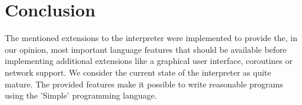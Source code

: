 \documentclass{article}
\begin{document}
\section{Conclusion}
The mentioned extensions to the interpreter were implemented to provide the, in our opinion, most important language features that should be available before implementing additional extensions like a graphical user interface, coroutines or network support. We consider the current state of the interpreter as quite mature. The provided features make it possible to write reasonable programs using the 'Simple' programming language.


\newpage
\end{document}
